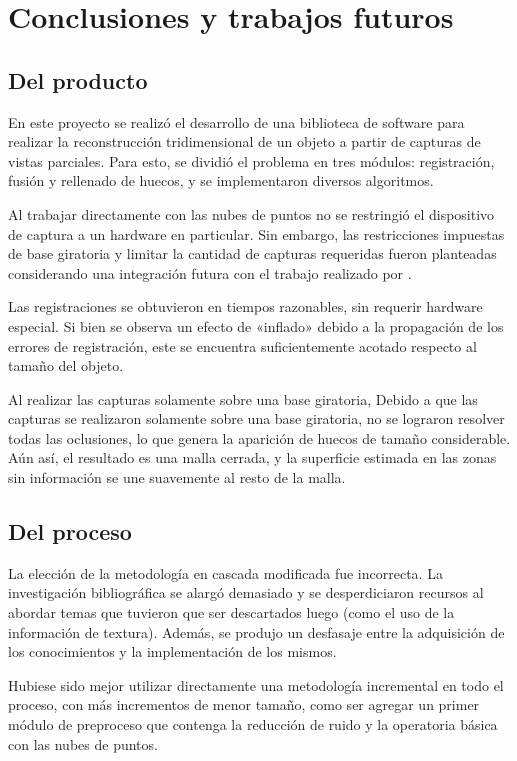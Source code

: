 \chapter{Conclusiones y trabajos futuros}
\section{Del producto}
	En este proyecto se realizó el desarrollo de una biblioteca de software para
	realizar la reconstrucción tridimensional de un objeto a partir de capturas de
	vistas parciales.
	Para esto, se dividió el problema en tres módulos: registración, fusión y
	rellenado de huecos, y se implementaron diversos algoritmos.

	Al trabajar directamente con las nubes de puntos no se restringió el
	dispositivo de captura a un hardware en particular. Sin embargo, las
	restricciones impuestas de base giratoria y limitar la cantidad de capturas
	requeridas fueron planteadas considerando una integración futura con
	el trabajo realizado por \cite{Pancho}.

	Las registraciones se obtuvieron en tiempos razonables, sin requerir hardware especial.
	Si bien se observa un efecto de «inflado» debido a la propagación de los errores de registración,
	este se encuentra suficientemente acotado respecto al tamaño del objeto.

	Al realizar las capturas solamente sobre una base giratoria,
	Debido a que las capturas se realizaron solamente sobre una base giratoria,
	no se lograron resolver todas las oclusiones, lo que genera la aparición de huecos de
	tamaño considerable.
	Aún así, el resultado es una malla cerrada, y la
	superficie estimada en las zonas sin información se une suavemente al resto de
	la malla.

\section{Del proceso}
La elección de la metodología en cascada modificada fue incorrecta.
La investigación bibliográfica se alargó demasiado y se desperdiciaron recursos
al abordar temas que tuvieron que ser descartados luego (como el uso de la
información de textura).
Además, se produjo un desfasaje entre la adquisición de los conocimientos y la
implementación de los mismos.

Hubiese sido mejor utilizar directamente una metodología incremental en todo el
proceso, con más incrementos de menor tamaño, como ser agregar un primer módulo
de preproceso que contenga la reducción de ruido y la operatoria básica con las
nubes de puntos.

